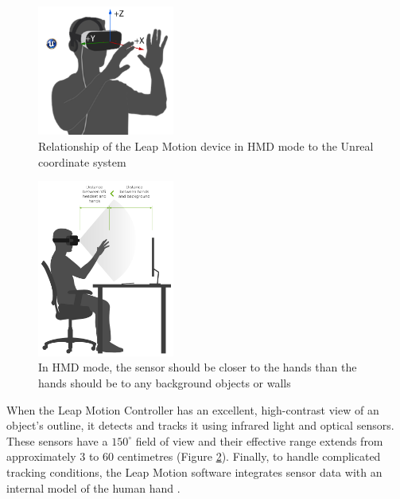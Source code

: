 \begin{figure}[!htb]
\includegraphics[width=0.4\textwidth]{figures/unrealAxes.png}
\centering
\caption{Relationship of the Leap Motion device in HMD mode to the Unreal coordinate system \cite{ULTP}}
\label{fig:unrealAxes}
\end{figure}

\begin{figure}[!htb]
\includegraphics[width=0.4\textwidth]{figures/HMDistance.png}
\centering
\caption{In HMD mode, the sensor should be closer to the hands than the hands should be to any background objects or walls \cite{ULTP}}
\label{fig:HMDistance}
\end{figure}

When the Leap Motion Controller has an excellent, high-contrast view of an object's outline, it detects and tracks it using infrared light and optical sensors. These sensors have a $150^\circ$ field of view and their effective range extends from approximately 3 to 60 centimetres (Figure \ref{fig:HMDistance}). Finally, to handle complicated tracking conditions, the Leap Motion software integrates sensor data with an internal model of the human hand \cite{ULTP}.

